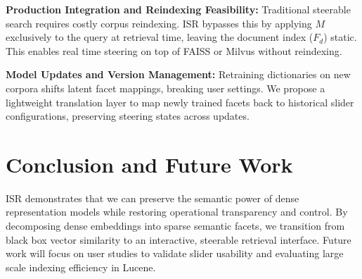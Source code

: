 \documentclass[sigconf,anonymous,screen]{acmart}
\begin{document}
\textbf{Production Integration and Reindexing Feasibility:} Traditional steerable search requires costly corpus reindexing. ISR bypasses this by applying $M$ exclusively to the query at retrieval time, leaving the document index ($F_d$) static. This enables real time steering on top of FAISS or Milvus without reindexing.

\textbf{Model Updates and Version Management:} Retraining dictionaries on new corpora shifts latent facet mappings, breaking user settings. We propose a lightweight translation layer to map newly trained facets back to historical slider configurations, preserving steering states across updates.

\vspace{-6pt}
\section{Conclusion and Future Work}
\vspace{-2pt}
ISR demonstrates that we can preserve the semantic power of dense representation models while restoring operational transparency and control. By decomposing dense embeddings into sparse semantic facets, we transition from black box vector similarity to an interactive, steerable retrieval interface. Future work will focus on user studies to validate slider usability and evaluating large scale indexing efficiency in Lucene.


\vspace{-8pt}
\end{document}
